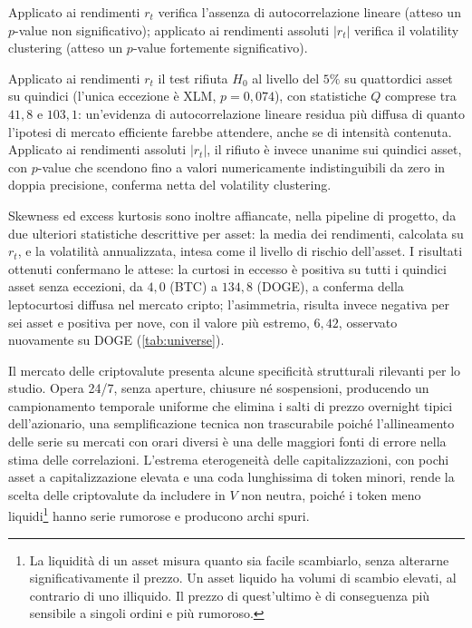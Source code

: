 Applicato ai rendimenti $r_t$ verifica l'assenza di autocorrelazione lineare (atteso un $p$-value non significativo); applicato ai rendimenti assoluti $|r_t|$ verifica il volatility clustering (atteso un $p$-value fortemente significativo).

Applicato ai rendimenti $r_t$ il test rifiuta $H_0$ al livello del $5\%$ su quattordici asset su quindici (l'unica eccezione è XLM, $p=0{,}074$), con statistiche $Q$ comprese tra $41{,}8$ e $103{,}1$: un'evidenza di autocorrelazione lineare residua più diffusa di quanto l'ipotesi di mercato efficiente farebbe attendere, anche se di intensità contenuta. Applicato ai rendimenti assoluti $|r_t|$, il rifiuto è invece unanime sui quindici asset, con $p$-value che scendono fino a valori numericamente indistinguibili da zero in doppia precisione, conferma netta del volatility clustering.

Skewness ed excess kurtosis sono inoltre affiancate, nella pipeline di progetto, da due ulteriori statistiche descrittive per asset: la media dei rendimenti, calcolata su $r_t$, e la volatilità annualizzata, intesa come il livello di rischio dell'asset. I risultati ottenuti confermano le attese: la curtosi in eccesso è positiva su tutti i quindici asset senza eccezioni, da $4{,}0$ (BTC) a $134{,}8$ (DOGE), a conferma della leptocurtosi diffusa nel mercato cripto; l'asimmetria, risulta invece negativa per sei asset e positiva per nove, con il valore più estremo, $6{,}42$, osservato nuovamente su DOGE (\cref{tab:universe}).



{
Il mercato delle criptovalute presenta alcune specificità strutturali rilevanti per lo studio. Opera 24/7, senza aperture, chiusure né sospensioni, producendo un campionamento temporale uniforme che elimina i salti di prezzo overnight tipici dell'azionario, una semplificazione tecnica non trascurabile poiché l'allineamento delle serie su mercati con orari diversi è una delle maggiori fonti di errore nella stima delle correlazioni. L'estrema eterogeneità delle capitalizzazioni, con pochi asset a capitalizzazione elevata e una coda lunghissima di token minori, rende la scelta delle criptovalute da includere in $V$ non neutra, poiché i token meno liquidi\footnote{La liquidità di un asset misura quanto sia facile scambiarlo, senza alterarne significativamente il prezzo. Un asset liquido ha volumi di scambio elevati, al contrario di uno illiquido. Il prezzo di quest'ultimo è di conseguenza più sensibile a singoli ordini e più rumoroso.} hanno serie rumorose e producono archi spuri.\par}

